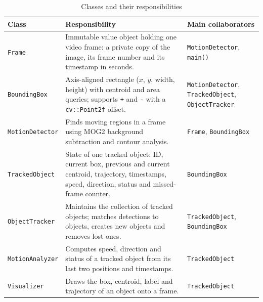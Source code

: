 \documentclass[12pt,a4paper,oneside]{book}
\begin{document}
\begin{table}[H]
\centering

\small
\begin{tabular}{@{}p{3.1cm}p{7.2cm}p{4.7cm}@{}}
\toprule
\textbf{Class} & \textbf{Responsibility} & \textbf{Main collaborators}\\
\midrule
\texttt{Frame} & Immutable value object holding one video frame: a private copy of the image, its frame number and its timestamp in seconds. & \texttt{MotionDetector}, \texttt{main()}\\
\texttt{BoundingBox} & Axis-aligned rectangle ($x$, $y$, width, height) with centroid and area queries; supports \texttt{+} and \texttt{-} with a \texttt{cv::Point2f} offset. & \texttt{MotionDetector}, \texttt{TrackedObject}, \texttt{ObjectTracker}\\
\texttt{MotionDetector} & Finds moving regions in a frame using MOG2 background subtraction and contour analysis. & \texttt{Frame}, \texttt{BoundingBox}\\
\texttt{TrackedObject} & State of one tracked object: ID, current box, previous and current centroid, trajectory, timestamps, speed, direction, status and missed-frame counter. & \texttt{BoundingBox}\\
\texttt{ObjectTracker} & Maintains the collection of tracked objects; matches detections to objects, creates new objects and removes lost ones. & \texttt{TrackedObject}, \texttt{BoundingBox}\\
\texttt{MotionAnalyzer} & Computes speed, direction and status of a tracked object from its last two positions and timestamps. & \texttt{TrackedObject}\\
\texttt{Visualizer} & Draws the box, centroid, label and trajectory of an object onto a frame. & \texttt{TrackedObject}\\
\bottomrule
\end{tabular}
\caption{Classes and their responsibilities}
\label{tab:classes}
\end{table}
\end{document}
